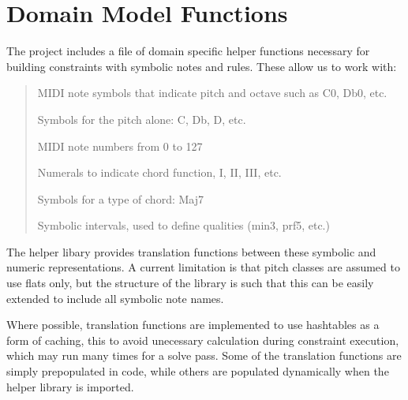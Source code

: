\documentclass[letterpaper,10pt,english]{sphinxmanual}
\begin{document}
\chapter{Domain Model Functions}
\label{\detokenize{index:domain-model-functions}}
\sphinxAtStartPar
The project includes a file of domain specific helper functions necessary for building
constraints with symbolic notes and rules. These allow us to work with:
\begin{quote}
\begin{description}
\sphinxAtStartPar
MIDI note symbols that indicate pitch and octave such as C0, Db0, etc.

\sphinxAtStartPar
Symbols for the pitch alone: C, Db, D, etc.

\sphinxAtStartPar
MIDI note numbers from 0 to 127

\sphinxAtStartPar
Numerals to indicate chord function, I, II, III, etc.

\sphinxAtStartPar
Symbols for a type of chord: Maj7

\sphinxAtStartPar
Symbolic intervals, used to define qualities (min\sphinxhyphen{}3, prf\sphinxhyphen{}5, etc.)

\end{description}
\end{quote}

\sphinxAtStartPar
The helper libary provides translation functions between these symbolic and numeric
representations. A current limitation is that pitch classes are assumed to use flats only,
but the structure of the library is such that this can be easily extended
to include all symbolic note names.

\sphinxAtStartPar
Where possible, translation functions are implemented to use hash\sphinxhyphen{}tables as a form
of caching, this to avoid unecessary calculation during constraint execution, which
may run many times for a solve pass. Some of the translation functions are simply
prepopulated in code, while others are populated dynamically when the helper
library is imported.
\end{document}
